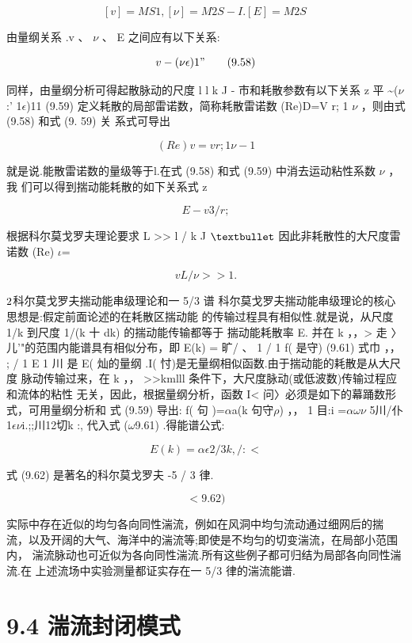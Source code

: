 \[[v] = MS 1, [\nu ] = M 2 S-I. [E] = M 2 S ~\]

由量纲关系 .v 、 $\nu$ 、 E 之间应有以下关系:

\begin{equation*}v - (\nu \epsilon )1"\tag{9.58}\end{equation*}

同样，由量纲分析可得起散脉动的尺度 l l k J - 市和耗散参数有以下关系 z 平 \textasciitilde{}($\nu$:' 1$\epsilon$)11 (9.59) 定义耗散的局部雷诺数，简称耗散雷诺数 (Re)D=V r; 1 $\nu$ ，则由式 (9.58) 和式 (9. 59) 关 系式可导出

\[(Re)v = vr; 1 \nu -1\]

就是说.能散雷诺数的量级等于l.在式 (9.58) 和式 (9.59) 中消去运动粘性系数 $\nu$ ，我 们可以得到揣动能耗散的如下关系式 z

\begin{equation*}E-v3 / r;\tag{9.60}\end{equation*}

根据科尔莫戈罗夫理论要求 L >> l / k J ${\rm •}$ 因此非耗散性的大尺度雷诺数 (Re) $\iota$=

\[vL/ \nu >> 1.\]

${\rm 2}$科尔莫戈罗夫揣动能串级理论和一 5/3 谱 科尔莫戈罗夫揣动能串级理论的核心思想是:假定前面论述的在耗散区揣动能 的传输过程具有相似性.就是说，从尺度 1/k 到尺度 1/(k 十 dk) 的揣动能传输都等于 揣动能耗散率 E. 并在 k ，，> 走 〉 儿'"的范围内能谱具有相似分布，即 E(k) = 旷/ 、 1 / 1 f( 是守) (9.61) 式巾 ，， ; / 1 E 1 川 是 E( 灿的量纲 .I( 忖)是无量纲相似函数.由于揣动能的耗散是从大尺度 脉动传输过来，在 k ，， >>kmlll 条件下，大尺度脉动(或低波数)传输过程应和流体的粘性 无关，因此，根据量纲分析，函数 I< 问〉必须是如下的幕踊数形式，可用量纲分析和 式 (9.59) 导出: f( 句 )=$\alpha$a(k 句守$\rho$) ，， 1 目:i =$\alpha$$\omega$$\nu$ 5川/仆1$\epsilon$$\nu$i.;;川12切k :, 代入式 ($\omega$9.61) .得能谱公式:

\[E(k) = \alpha \epsilon  2 / 3 k , / :<\]

式 (9.62) 是著名的科尔莫戈罗夫 -5 / 3 律.

\[< 9. 62)\]

实际中存在近似的均匀各向同性湍流，例如在风洞中均匀流动通过细网后的揣 流，以及开阔的大气、海洋中的湍流等;即使是不均匀的切变湍流，在局部小范围内， 湍流脉动也可近似为各向同性湍流.所有这些例子都可归结为局部各向同性湍流.在 上述流场中实验测量都证实存在一 5/3 律的湍流能谱.

\section*{9.4  湍流封闭模式}

